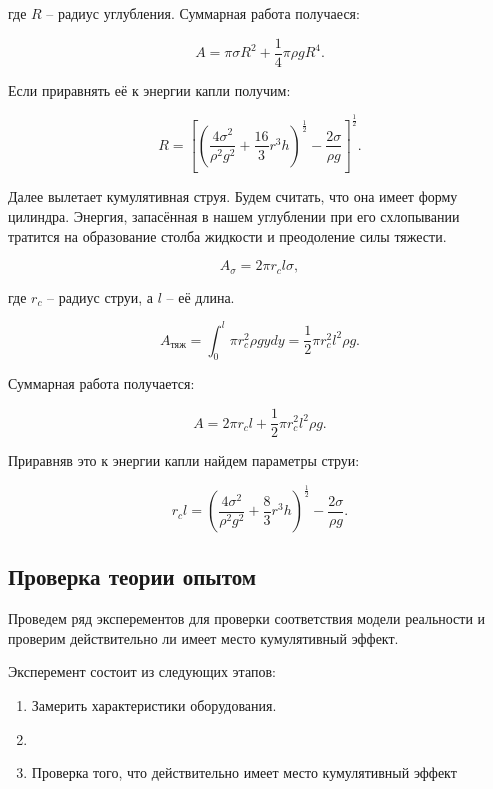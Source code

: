 \documentclass[a4paper, 12pt]{article}
\begin{document}
где $R$ -- радиус углубления.
Суммарная работа получаеся:

\begin{equation}
    A = \pi\sigma{R^2} + \frac{1}{4}\pi{\rho}gR^4.
\end{equation}

Если приравнять её к энергии капли получим:

\begin{equation}
    R = \left [\left (\frac{4\sigma^2}{\rho^2g^2} +
               \frac{16}{3}r^3h \right )^\frac{1}{2}
               - \frac{2\sigma}{\rho{g}} \right ] ^ \frac{1}{2}.
\end{equation}


Далее вылетает кумулятивная струя. Будем считать, что она имеет форму
цилиндра. Энергия, запасённая в нашем углублении при его схлопывании
тратится на образование столба жидкости и преодоление силы тяжести.

\begin{equation}
    A_\sigma = 2\pi{r_c}l\sigma,
\end{equation}

где $r_c$ -- радиус струи, а $l$ -- её длина.

\begin{equation}
    A_\text{тяж} = \int_{0}^{l} \pi{r_c^2}\rho{g}ydy =
                   \frac{1}{2}\pi{r_c^2}l^2\rho{g}.
\end{equation}

Суммарная работа получается:

\begin{equation}
    A = 2\pi{r_c}l + \frac{1}{2}\pi{r_c^2}l^2\rho{g}.
\end{equation}

Приравняв это к энергии капли найдем параметры струи:

\begin{equation}
    r_cl = \left (\frac{4\sigma^2}{\rho^2g^2} + \frac{8}{3}
                  r^3h \right ) ^ \frac{1}{2} - \frac{2\sigma}{\rho{g}}.
\end{equation}

\begin{center}
    \subsection*{Проверка теории опытом}
\end{center}

Проведем ряд эксперементов для проверки соответствия модели реальности и проверим действительно ли имеет место кумулятивный эффект.

Эксперемент состоит из следующих этапов:

\begin{enumerate}
    \item Замерить характеристики оборудования.
    
    \item 
    
    \item Проверка того, что действительно имеет место кумулятивный эффект
\end{enumerate}
\end{document}
